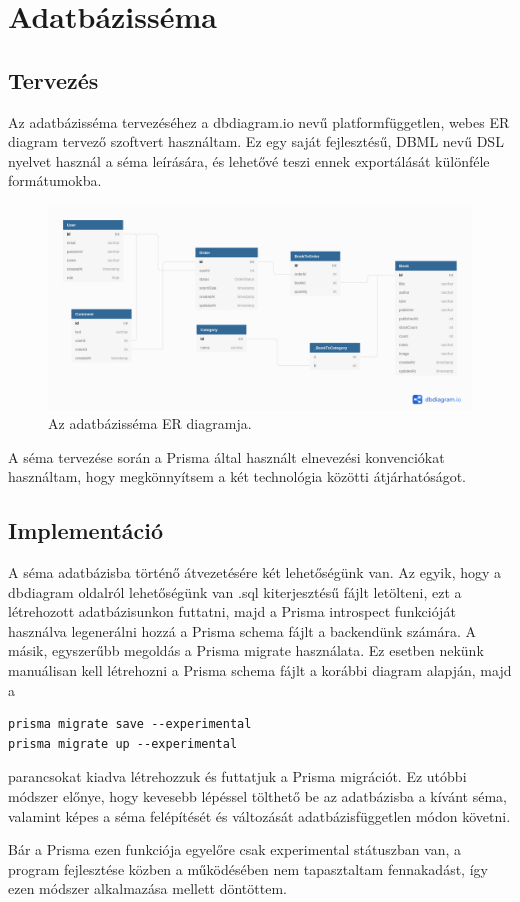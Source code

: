 \section{Adatbázisséma}

\subsection{Tervezés}

Az adatbázisséma tervezéséhez a dbdiagram.io nevű platformfüggetlen, webes ER diagram tervező szoftvert használtam.
Ez egy saját fejlesztésű, DBML nevű DSL nyelvet használ a séma leírására, és lehetővé teszi ennek exportálását különféle formátumokba.

\begin{figure}[!ht]
\centering
\includegraphics[width=150mm, keepaspectratio]{figures/dbschema.png}
\caption{Az adatbázisséma ER diagramja.}
\label{fig:DBSchema}
\end{figure}

A séma tervezése során a Prisma által használt elnevezési konvenciókat használtam, hogy megkönnyítsem a két technológia közötti átjárhatóságot.

\subsection{Implementáció}

A séma adatbázisba történő átvezetésére két lehetőségünk van. Az egyik, hogy a dbdiagram oldalról lehetőségünk van .sql kiterjesztésű fájlt letölteni,
ezt a létrehozott adatbázisunkon futtatni, majd a Prisma introspect funkcióját használva legenerálni hozzá a Prisma schema fájlt a backendünk számára.
A másik, egyszerűbb megoldás a Prisma migrate használata. Ez esetben nekünk manuálisan kell létrehozni a Prisma schema fájlt a
korábbi diagram alapján, majd a
\begin{lstlisting}
prisma migrate save --experimental
prisma migrate up --experimental
\end{lstlisting}

parancsokat kiadva létrehozzuk és futtatjuk a Prisma migrációt.
Ez utóbbi módszer előnye, hogy kevesebb lépéssel tölthető be az adatbázisba a kívánt séma, valamint képes a séma felépítését és
változását adatbázisfüggetlen módon követni.

Bár a Prisma ezen funkciója egyelőre csak experimental státuszban van,
a program fejlesztése közben a működésében nem tapasztaltam fennakadást, így ezen módszer alkalmazása mellett döntöttem.
